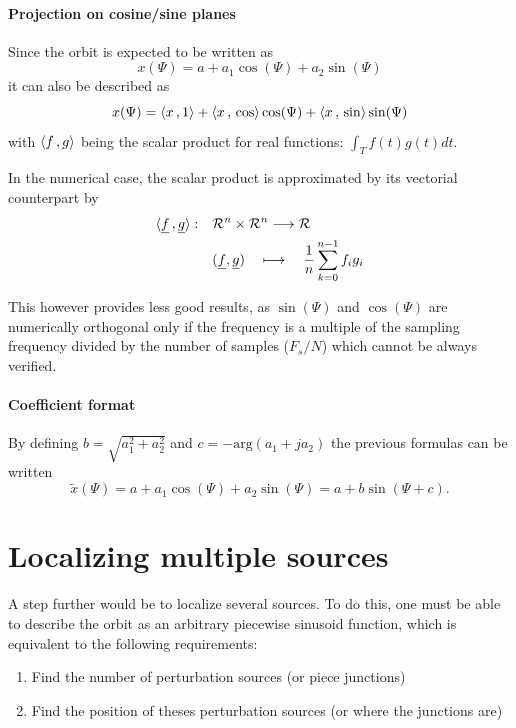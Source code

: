 \paragraph{Projection on cosine/sine planes}
Since the orbit is expected to be written as
\begin{equation*}
x(\Psi) = a+ a_1 \cos(\Psi) + a_2 \sin(\Psi)
\end{equation*}
it can also be described as
\begin{equation}
x(\Psi) = \langle x {\,,\,} 1 \rangle + \langle x {\,,\,} \cos \rangle \cos(\Psi) + \langle x {\,,\,} \sin \rangle \sin(\Psi)
\end{equation}
with $\langle f {\,,\,} g \rangle$ being the scalar product for real functions: $\int_T f(t)g(t)dt$.

In the numerical case, the scalar product is approximated by its vectorial counterpart by
\begin{align*}
\langle \underline{f} {\,,\,} \underline{g} \rangle: \quad
 &\mathcal{R}^n \times \mathcal{R}^n \longrightarrow \mathcal{R} \\
 & (\underline{f},\underline{g}) \quad\longmapsto \quad \frac{1}{n}\sum\limits_{k=0}^{n-1} f_i g_i
\end{align*}

This however provides less good results, as $\sin(\Psi)$ and $\cos(\Psi)$ are numerically orthogonal only if the frequency is a multiple of the sampling frequency divided by the number of samples ($F_s/N$) which cannot be always verified.

\paragraph{Coefficient format}
By defining $b = \sqrt{a_1^2+a_2^2}$ and $c = -\mathrm{arg}(a_1 + j a_2)$ the previous formulas can be written
\begin{equation*}
\tilde{x}(\Psi) = a + a_1 \cos(\Psi) + a_2 \sin(\Psi) = a + b \sin(\Psi + c).
\end{equation*}

\section{Localizing multiple sources}
A step further would be to localize several sources. To do this, one must be able to describe the orbit as an arbitrary piecewise sinusoid function, which is equivalent to the following requirements:
\begin{enumerate}
    \item Find the number of perturbation sources (or piece junctions)
    \item Find the position of theses perturbation sources (or where the junctions are)
\end{enumerate}

